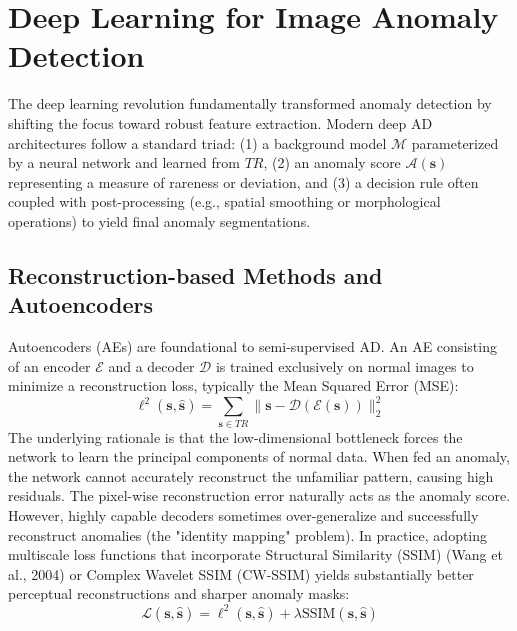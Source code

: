 \section{Deep Learning for Image Anomaly Detection}
The deep learning revolution fundamentally transformed anomaly detection by shifting the focus toward robust feature extraction. Modern deep AD architectures follow a standard triad: (1) a background model $\mathcal{M}$ parameterized by a neural network and learned from $TR$, (2) an anomaly score $\mathcal{A}(\boldsymbol{s})$ representing a measure of rareness or deviation, and (3) a decision rule often coupled with post-processing (e.g., spatial smoothing or morphological operations) to yield final anomaly segmentations.

\subsection{Reconstruction-based Methods and Autoencoders}
Autoencoders (AEs) are foundational to semi-supervised AD. An AE consisting of an encoder $\mathcal{E}$ and a decoder $\mathcal{D}$ is trained exclusively on normal images to minimize a reconstruction loss, typically the Mean Squared Error (MSE):
\begin{equation}
    \ell^2(\boldsymbol{s}, \hat{\boldsymbol{s}}) = \sum_{\boldsymbol{s} \in TR} \| \boldsymbol{s} - \mathcal{D}(\mathcal{E}(\boldsymbol{s})) \|_2^2
\end{equation}
The underlying rationale is that the low-dimensional bottleneck forces the network to learn the principal components of normal data. When fed an anomaly, the network cannot accurately reconstruct the unfamiliar pattern, causing high residuals. The pixel-wise reconstruction error naturally acts as the anomaly score. However, highly capable decoders sometimes over-generalize and successfully reconstruct anomalies (the "identity mapping" problem). In practice, adopting multiscale loss functions that incorporate Structural Similarity (SSIM) (Wang et al., 2004) or Complex Wavelet SSIM (CW-SSIM) yields substantially better perceptual reconstructions and sharper anomaly masks:
\begin{equation}
    \mathcal{L}(\boldsymbol{s}, \hat{\boldsymbol{s}}) = \ell^2(\boldsymbol{s}, \hat{\boldsymbol{s}}) + \lambda \text{SSIM}(\boldsymbol{s}, \hat{\boldsymbol{s}})
\end{equation}

